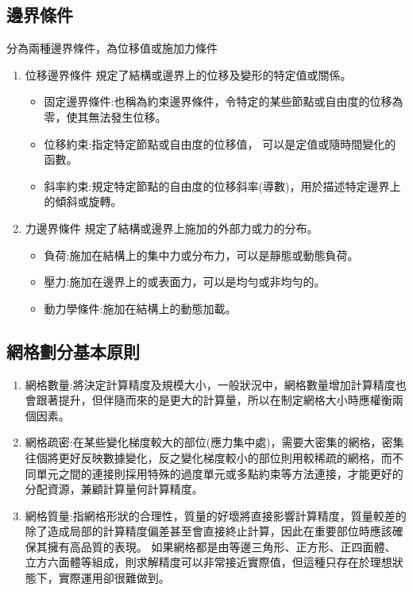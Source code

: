 \subsection{邊界條件}
分為兩種邊界條件，為位移值或施加力條件

\begin{enumerate}
\item 位移邊界條件
規定了結構或邊界上的位移及變形的特定值或關係。

\begin{itemize}
\item 固定邊界條件:也稱為約束邊界條件，令特定的某些節點或自由度的位移為零，使其無法發生位移。
\item 位移約束:指定特定節點或自由度的位移值， 可以是定值或隨時間變化的函數。
\item 斜率約束:規定特定節點的自由度的位移斜率(導數)，用於描述特定邊界上的傾斜或旋轉。
\end{itemize}

\item 力邊界條件
規定了結構或邊界上施加的外部力或力的分布。

\begin{itemize}
\item 負荷:施加在結構上的集中力或分布力，可以是靜態或動態負荷。
\item 壓力:施加在邊界上的或表面力，可以是均勻或非均勻的。
\item 動力學條件:施加在結構上的動態加載。
\end{itemize}
\end{enumerate}

\subsection{網格劃分基本原則}
\begin{enumerate}
\item 網格數量:將決定計算精度及規模大小，一般狀況中，網格數量增加計算精度也會跟著提升，但伴隨而來的是更大的計算量，所以在制定網格大小時應權衡兩個因素。
\item 網格疏密:在某些變化梯度較大的部位(應力集中處)，需要大密集的網格，密集往個將更好反映數據變化，反之變化梯度較小的部位則用較稀疏的網格，而不同單元之間的連接則採用特殊的過度單元或多點約束等方法連接，才能更好的分配資源，兼顧計算量何計算精度。
\item 網格質量:指網格形狀的合理性，質量的好壞將直接影響計算精度，質量較差的除了造成局部的計算精度偏差甚至會直接終止計算，因此在重要部位時應該確保其擁有高品質的表現。
如果網格都是由等邊三角形、正方形、正四面體、立方六面體等組成，則求解精度可以非常接近實際值，但這種只存在於理想狀態下，實際運用卻很難做到。\
\end{enumerate}

